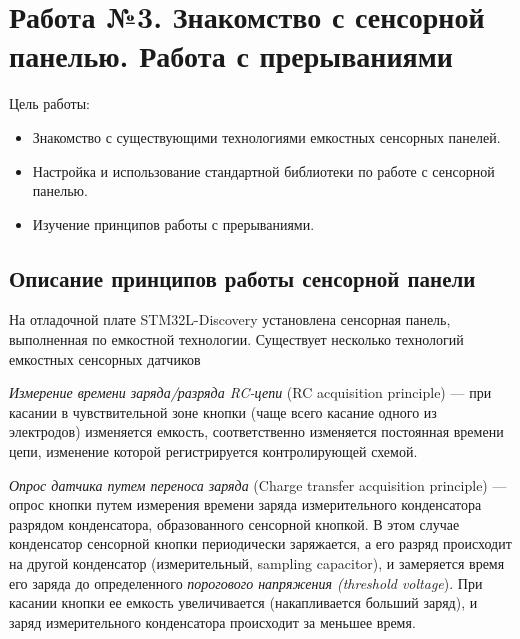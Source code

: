 \chapter{Работа №3. Знакомство с сенсорной панелью. Работа с прерываниями}

Цель работы: 
\begin{itemize}
\item Знакомство с существующими технологиями емкостных сенсорных панелей.
\item Настройка и использование стандартной библиотеки по работе с сенсорной панелью.
\item Изучение принципов работы с прерываниями.
\end{itemize}

\section{Описание принципов работы сенсорной панели}
На отладочной плате STM32L-Discovery установлена сенсорная панель, выполненная по емкостной технологии. Существует несколько технологий емкостных сенсорных датчиков

\textit{Измерение времени заряда/разряда RC-цепи} (RC acquisition principle) --- при касании в чувствительной зоне кнопки (чаще всего касание одного из электродов) изменяется емкость, соответственно изменяется постоянная времени цепи, изменение которой регистрируется контролирующей схемой. 
	
	\textit{Опрос датчика путем переноса заряда} (Charge transfer acquisition principle) --- опрос кнопки путем измерения времени заряда измерительного конденсатора разрядом конденсатора, образованного сенсорной кнопкой. В этом случае конденсатор сенсорной кнопки периодически заряжается, а его разряд происходит на другой конденсатор (измерительный, sampling capacitor), и замеряется время его заряда до определенного \textit{порогового напряжения (threshold voltage}). При касании кнопки ее емкость увеличивается (накапливается больший заряд), и заряд измерительного конденсатора происходит за меньшее время.   
	
